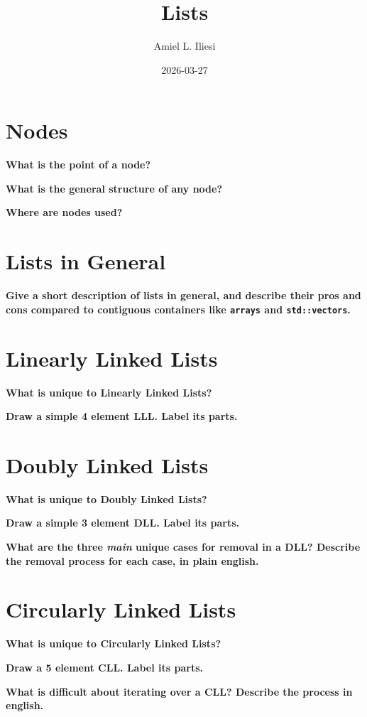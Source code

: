 \documentclass[12pt, letterpaper]{article}
\title{Lists}
\author{Amiel L. Iliesi}
\date{2026-03-27}
\newcommand{\question}[2][4em]{\textbf{#2}\vspace{#1}\par}
\begin{document}
\maketitle

\tableofcontents

\pagebreak
\section{Nodes}
\question{What is the point of a node?}

\question{What is the general structure of any node?}

\question{Where are nodes used?}

\pagebreak
\section{Lists in General}
\question{Give a short description of lists in general, and describe their pros
and cons compared to contiguous containers like \texttt{arrays} and
\texttt{std::vectors}.}

\pagebreak
\section{Linearly Linked Lists}
\question{What is unique to Linearly Linked Lists?}

\question[12em]{Draw a simple 4 element LLL. Label its parts.}

\pagebreak
\section{Doubly Linked Lists}
\question{What is unique to Doubly Linked Lists?}

\question[12em]{Draw a simple 3 element DLL. Label its parts.}

\question[12em]{What are the three \textit{main} unique cases for removal in a
DLL? Describe the removal process for each case, in plain english.}

\pagebreak
\section{Circularly Linked Lists}
\question{What is unique to Circularly Linked Lists?}

\question[12em]{Draw a 5 element CLL. Label its parts.}

\question[8em]{What is difficult about iterating over a CLL? Describe the
process in english.}
\end{document}
